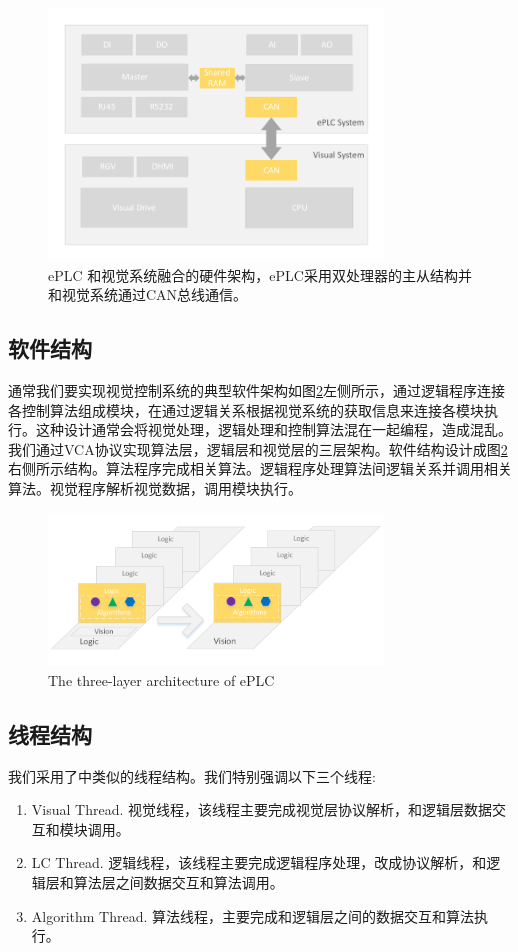 \documentclass[journal,UTF8]{IEEEtran}
\begin{document}
\begin{figure}
	\centering
	\includegraphics[width=3.5in]{fig/Hardware.pdf}
	\caption{ePLC 和视觉系统融合的硬件架构，ePLC采用双处理器的主从结构并和视觉系统通过CAN总线通信。}
	\label{fig:Hardware}
\end{figure}
\subsection{软件结构}
通常我们要实现视觉控制系统的典型软件架构如图\ref{fig:Software}左侧所示，通过逻辑程序连接各控制算法组成模块，在通过逻辑关系根据视觉系统的获取信息来连接各模块执行。这种设计通常会将视觉处理，逻辑处理和控制算法混在一起编程，造成混乱。我们通过VCA协议实现算法层，逻辑层和视觉层的三层架构。软件结构设计成图\ref{fig:Software}右侧所示结构。算法程序完成相关算法。逻辑程序处理算法间逻辑关系并调用相关算法。视觉程序解析视觉数据，调用模块执行。


\begin{figure}
	\centering
	\includegraphics[width=3.5in]{fig/Software.pdf}
	\caption{The three-layer architecture of ePLC}
	\label{fig:Software}
\end{figure}



\subsection{线程结构}
我们采用了\cite{wu2018customized}中类似的线程结构。我们特别强调以下三个线程:
\begin{enumerate}
	\item Visual Thread. 视觉线程，该线程主要完成视觉层协议解析，和逻辑层数据交互和模块调用。
	\item LC Thread. 逻辑线程，该线程主要完成逻辑程序处理，改成协议解析，和逻辑层和算法层之间数据交互和算法调用。
	\item Algorithm Thread. 算法线程，主要完成和逻辑层之间的数据交互和算法执行。
\end{enumerate}
\end{document}
